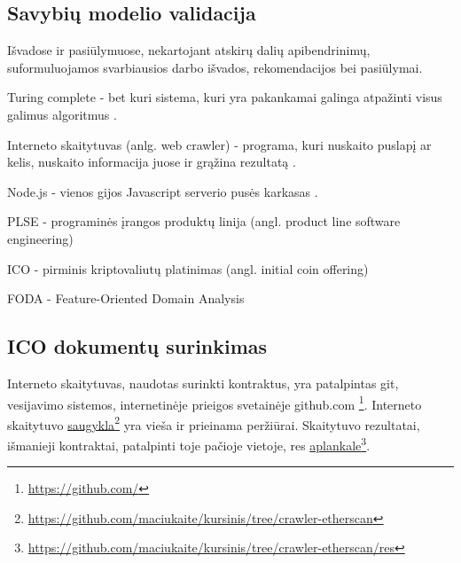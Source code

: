 \documentclass{VUMIFPSkursinis}
\begin{document}
\subsection{Savybių modelio validacija} \label{validacija}








Išvadose ir pasiūlymuose, nekartojant atskirų dalių apibendrinimų,
suformuluojamos svarbiausios darbo išvados, rekomendacijos bei pasiūlymai.



\printbibliography[heading=bibintoc] %

Turing complete - bet kuri sistema, kuri yra pakankamai galinga atpažinti visus galimus algoritmus \cite{Teller1994}. 

Interneto skaitytuvas (anlg. web crawler) - programa, kuri nuskaito puslapį ar kelis, nuskaito informacija juose ir grąžina rezultatą \cite{Thelwall2001}.

Node.js - vienos gijos Javascript serverio pusės karkasas \cite{Mccune}.


PLSE - programinės įrangos produktų linija (angl. product line software engineering)

ICO - pirminis kriptovaliutų platinimas (angl. initial coin offering)

FODA - Feature-Oriented Domain Analysis \cite{Kang1990}

%
\pagebreak

\subsection*{ ICO dokumentų surinkimas}

Interneto skaitytuvas, naudotas surinkti kontraktus, yra patalpintas git, vesijavimo sistemos, internetinėje prieigos svetainėje github.com \footnote{\url {https://github.com/}}. Interneto skaitytuvo \href{https://github.com/maciukaite/kursinis/tree/crawler-etherscan}{saugykla}\footnote{\url{https://github.com/maciukaite/kursinis/tree/crawler-etherscan}} yra vieša ir prieinama peržiūrai. Skaitytuvo rezultatai, išmanieji kontraktai, patalpinti toje pačioje vietoje, res \href{https://github.com/maciukaite/kursinis/tree/crawler-etherscan/res}{aplankale}\footnote{\url{https://github.com/maciukaite/kursinis/tree/crawler-etherscan/res}}.
\end{document}
